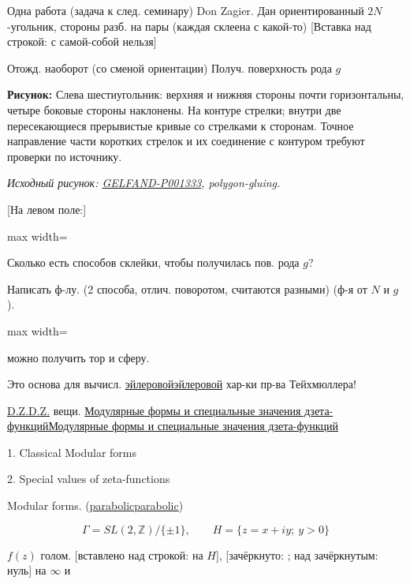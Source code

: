 \documentclass[11pt]{article}
\theoremstyle{definition}
\theoremstyle{remark}
\newcommand{\Unclear}[3]{%
  \begingroup\color{orange!70!black}%
  [Unresolved reading #1/#2: #3]\endgroup%
}
\newcommand{\SourceFigure}[3]{%
  \par\begingroup\color{blue!60!black}\textbf{\hyperref[#1:source-page]{Source figure #1/#2}:} #3%
  \par\textit{Consult the authoritative scan at this locator.}\endgroup\par%
}
\renewcommand{\Unclear}[3]{%
  \begingroup\color{orange!65!black}%
  \ifmmode\text{[неясно: #3]}\else[неясно: #3]\fi\endgroup%
}
\renewcommand{\SourceFigure}[3]{%
  \par\begingroup\color{blue!55!black}\textbf{Рисунок:} #3%
  \par{\small\textit{Исходный рисунок: \hyperref[#1:source-page]{#1}, #2.}}%
  \endgroup\par%
}
\let\DiplomaticMathUnderline\underline
\renewcommand{\underline}[1]{\ifmmode\DiplomaticMathUnderline{#1}\else\uline{#1}\fi}
\begin{document}
Одна работа (задача к след. семинару) Don Zagier.
Дан ориентированный $2N$-угольник, стороны разб. на пары
(каждая склеена с какой-то)
[Вставка над строкой: с самой-собой нельзя]

Отожд. наоборот (со сменой ориентации)
Получ. поверхность рода $g$

\SourceFigure{GELFAND-P001333}{polygon-gluing}{Слева шестиугольник: верхняя и нижняя стороны почти горизонтальны, четыре боковые стороны наклонены. На контуре стрелки; внутри две пересекающиеся прерывистые кривые со стрелками к сторонам. Точное направление части коротких стрелок и их соединение с контуром требуют проверки по источнику.}

[На левом поле:]
\begin{adjustbox}{max width=\linewidth}
\end{adjustbox}

Сколько есть способов склейки, чтобы получилась пов. рода $g$?

Написать ф-лу. (2 способа, отлич. поворотом, считаются разными)
(ф-я от $N$ и $g$).

\begin{adjustbox}{max width=\linewidth}
\end{adjustbox}
можно получить тор и сферу.

Это основа для вычисл. \underline{эйлеровой} хар-ки пр-ва Тейхмюллера!

\underline{D.Z.} вещи.
\underline{Модулярные формы и специальные значения дзета-функций}

1. Classical Modular forms

2. Special values of zeta-functions

Modular forms. (\underline{parabolic})

\begin{equation*}
\Gamma=SL(2,\mathbb Z)/\{\pm1\},\qquad
H=\{z=x+iy;\ y>0\}
\end{equation*}

$f(z)$ голом. [вставлено над строкой: на $H$],
[зачёркнуто: \Unclear{GELFAND-P001333}{cusp-cancellation}{$O(1)$?}; над зачёркнутым: нуль]
на $\infty$ и
\end{document}
